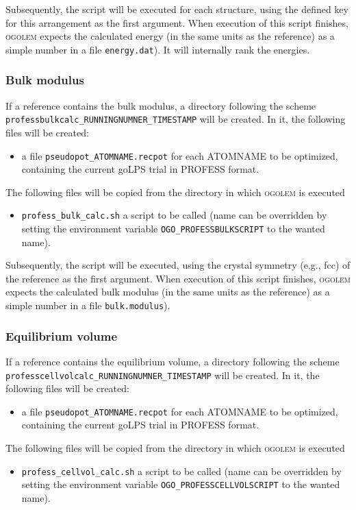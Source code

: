 \documentclass[a4paper,10pt]{scrbook}
\newcommand{\ogo}{\textsc{ogolem}}
\begin{document}
Subsequently, the script will be executed for each structure, using the defined key for this arrangement as the first argument. When execution of
this script finishes, \ogo{} expects the calculated energy (in the same units as the reference) as
a simple number in a file \texttt{energy.dat}). It will internally rank the energies.

\subsubsection{Bulk modulus}
If a reference contains the bulk modulus, a directory following the scheme
\texttt{professbulkcalc\_RUNNINGNUMNER\_TIMESTAMP} will be created. In it, the following files will be created:
\begin{itemize}
 \item a file \texttt{pseudopot\_ATOMNAME.recpot} for each ATOMNAME to be optimized,
 containing the current goLPS trial in PROFESS format.
\end{itemize}
The following files will be copied from the directory in which \ogo{} is executed
\begin{itemize}
 \item \texttt{profess\_bulk\_calc.sh} a script to be called (name can be overridden
 by setting the environment variable \texttt{OGO\_PROFESSBULKSCRIPT} to the wanted
 name).
\end{itemize}

Subsequently, the script will be executed, using the crystal symmetry (e.g., fcc) of the reference as the first argument. When execution of
this script finishes, \ogo{} expects the calculated bulk modulus (in the same units as the reference) as
a simple number in a file \texttt{bulk.modulus}).

\subsubsection{Equilibrium volume}
If a reference contains the equilibrium volume, a directory following the scheme
\texttt{professcellvolcalc\_RUNNINGNUMNER\_TIMESTAMP} will be created. In it, the following files will be created:
\begin{itemize}
 \item a file \texttt{pseudopot\_ATOMNAME.recpot} for each ATOMNAME to be optimized,
 containing the current goLPS trial in PROFESS format.
\end{itemize}
The following files will be copied from the directory in which \ogo{} is executed
\begin{itemize}
 \item \texttt{profess\_cellvol\_calc.sh} a script to be called (name can be overridden
 by setting the environment variable \texttt{OGO\_PROFESSCELLVOLSCRIPT} to the wanted
 name).
\end{itemize}
\end{document}
